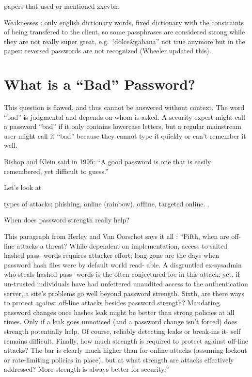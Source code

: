 papers that used or mentioned zxcvbn:
\cite{Komanduri2014Telepathwords}
\cite{Wang2016fuzzyPWM}
\cite{Ur2017DataDrivenPWMeter}
\cite{Yang2016MnemonicSentenceBased}
\cite{Gross2016CognitiveDepletion}

Weaknesses \cite{DeCarnedeCarnavalet2015PasswordMeters}: only english dictionary words, fixed dictionary with the constraints of being transfered to the client, so some passphrases are considered strong while they are not really super great, e.g. ``dolce\&gabana''
not true anymore but in the paper: reversed passwords are not recognized (Wheeler updated this). 


\section{What is a ``Bad'' Password?}
This question is flawed, and thus cannot be answered without context. The word ``bad'' is judgmental and depends on whom is asked. A security expert might call a password ``bad'' if it only contains lowercase letters, but a regular mainstream user might call it ``bad'' because they cannot type it quickly or can't remember it well. 

Bishop and Klein said in 1995: ``A good password is one that is easily remembered, yet difficult to guess.'' \cite[p. 231]{Bishop1995ProactivePasswordChecking}

Let's look at 

types of attacks: phishing, online (rainbow), offline, targeted online. \cite{ZhangKennedy2016RevisitingPasswordRules}. 

When does password strength really help? 

This paragraph from Herley and Van Oorschot says it all \cite{Herley2012PersistenceOfPasswords}:
``Fifth, when are off-line attacks a threat? While dependent on implementation, access to salted hashed pass- words requires attacker effort; long gone are the days when password hash files were by default world read- able. A disgruntled ex-sysadmin who steals hashed pass- words is the often-conjectured foe in this attack; yet, if un-trusted individuals have had unfettered unaudited access to the authentication server, a site’s problems go well beyond password strength. Sixth, are there ways to protect against off-line attacks besides password strength? Mandating password changes once hashes leak might be better than strong policies at all times. Only if a leak goes unnoticed (and a password change isn’t forced) does strength potentially help. Of course, reliably detecting leaks or break-ins it- self remains difficult. Finally, how much strength is required to protect against off-line attacks? The bar is clearly much higher than for online attacks (assuming lockout or rate-limiting policies in place), but at what strength are attacks effectively addressed? More strength is always better for security,'' 

